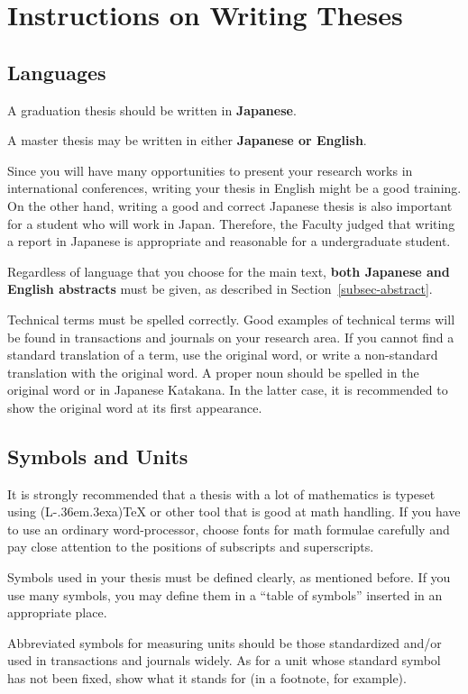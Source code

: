 \documentclass[english]{kuisthesis}
\def\LATEX{{\rm (L\kern-.36em\raise.3ex\hbox{\sc a})\TeX}}
\let\EM\bf
\begin{document}
\section{Instructions on Writing Theses}\label{sec-instruction}
\subsection{Languages}\label{subsec-language}
A graduation thesis should be written in {\EM Japanese}.

A master thesis may be written in either {\EM Japanese or English}.

Since you will have many opportunities to present your research works in
international conferences, writing your thesis in English might be a good
training.  On the other hand, writing a good and correct Japanese thesis is
also important for a student who will work in Japan.  Therefore, the
Faculty judged that writing a report in Japanese is appropriate and
reasonable for a undergraduate student.

Regardless of language that you choose for the main text, {\EM both
Japanese and English abstracts} must be given, as described in
Section~\ref{subsec-abstract}.

Technical terms must be spelled correctly.  Good examples of technical terms
will be found in transactions and journals on your research area.  If you
cannot find a standard translation of a term, use the original word, or
write a non-standard translation with the original word.  A proper noun
should be spelled in the original word or in Japanese Katakana.  In the
latter case, it is recommended to show the original word at its first
appearance.

\subsection{Symbols and Units}\label{subsec-symbol}
It is strongly recommended that a thesis with a lot of mathematics is
typeset using \LATEX{} or other tool that is good at math handling.  If
you have to use an ordinary word-processor, choose fonts for math formulae
carefully and pay close attention to the positions of subscripts and
superscripts.

Symbols used in your thesis must be defined clearly, as mentioned before.
If you use many symbols, you may define them in a ``table of symbols''
inserted in an appropriate place.

Abbreviated symbols for measuring units should be those standardized
and\slash or used in transactions and journals widely.  As for a unit whose
standard symbol has not been fixed, show what it stands for (in a footnote,
for example).
\end{document}
